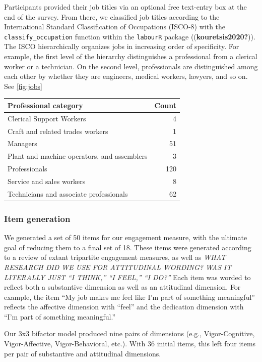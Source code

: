 \documentclass[
  english,
  man]{apa6}
\begin{document}
Participants provided their job titles via an optional free text-entry box at the end of the survey. From there, we classified job titles according to the International Standard Classification of Occupations (ISCO-8) with the \texttt{classify\_occupation} function within the \texttt{labourR} package ((\textbf{kouretsis2020?})). The ISCO hierarchically organizes jobs in increasing order of specificity. For example, the first level of the hierarchy distinguishes a professional from a clerical worker or a technician. On the second level, professionals are distinguished among each other by whether they are engineers, medical workers, lawyers, and so on. See \ref{fig:jobs}

\begin{tabular}{l|r}
\hline
Professional category & Count\\
\hline
Clerical Support Workers & 4\\
\hline
Craft and related trades workers & 1\\
\hline
Managers & 51\\
\hline
Plant and machine operators, and assemblers & 3\\
\hline
Professionals & 120\\
\hline
Service and sales workers & 8\\
\hline
Technicians and associate professionals & 62\\
\hline
\end{tabular}

\hypertarget{item-generation}{%
\subsubsection{Item generation}\label{item-generation}}

We generated a set of 50 items for our engagement measure, with the ultimate goal of reducing them to a final set of 18. These items were generated according to a review of extant tripartite engagement measures, as well as \emph{WHAT RESEARCH DID WE USE FOR ATTITUDINAL WORDING? WAS IT LITERALLY JUST ``I THINK,'' ``I FEEL,'' ``I DO?''} Each item was worded to reflect both a substantive dimension as well as an attitudinal dimension. For example, the item ``My job makes me feel like I'm part of something meaningful'' reflects the affective dimension with ``feel'' and the dedication dimension with ``I'm part of something meaningful.''

Our 3x3 bifactor model produced nine pairs of dimensions (e.g., Vigor-Cognitive, Vigor-Affective, Vigor-Behavioral, etc.). With 36 initial items, this left four items per pair of substantive and attitudinal dimensions.
\end{document}
